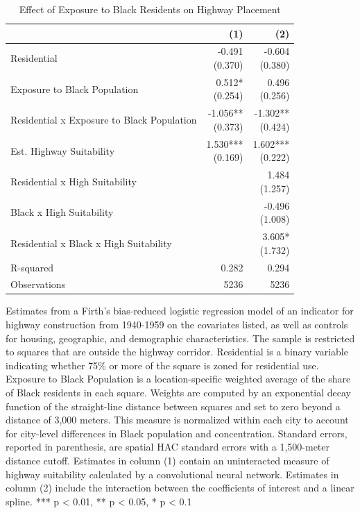 \begin{table}[h]
\centering
\caption{Effect of Exposure to Black Residents on Highway Placement}
\label{tab:results/black_share}
\begin{threeparttable}
\begin{tabular*}{0.8\textwidth}{@{\extracolsep{\fill}}l*{2}{r}}
\toprule
 & (1) & (2) \\
\midrule
Residential & \makecell[tr]{-0.491 \\ (0.370)} & \makecell[tr]{-0.604 \\ (0.380)} \\
Exposure to Black Population & \makecell[tr]{0.512{*} \\ (0.254)} & \makecell[tr]{0.496 \\ (0.256)} \\
Residential x Exposure to Black Population & \makecell[tr]{-1.056{**} \\ (0.373)} & \makecell[tr]{-1.302{**} \\ (0.424)} \\
Est. Highway Suitability & \makecell[tr]{1.530{***} \\ (0.169)} & \makecell[tr]{1.602{***} \\ (0.222)} \\
Residential x High Suitability &  & \makecell[tr]{1.484 \\ (1.257)} \\
Black x High Suitability &  & \makecell[tr]{-0.496 \\ (1.008)} \\
Residential x Black x High Suitability &  & \makecell[tr]{3.605{*} \\ (1.732)} \\
R-squared & 0.282 & 0.294 \\
Observations & 5236 & 5236 \\
\bottomrule
\end{tabular*}
\begin{tablenotes}[flushleft]
\footnotesize
\item Estimates from a Firth's bias-reduced logistic regression model of an indicator for highway construction from 1940-1959 on the covariates listed, as well as controls for housing, geographic, and demographic characteristics. The sample is restricted to squares that are outside the highway corridor. Residential is a binary variable indicating whether 75\% or more of the square is zoned for residential use. Exposure to Black Population is a location-specific weighted average of the share of Black residents in each square. Weights are computed by an exponential decay function of the straight-line distance between squares and set to zero beyond a distance of 3,000 meters. This measure is normalized within each city to account for city-level differences in Black population and concentration. Standard errors, reported in parenthesis, are \textcite{conley_gmm_1999} spatial HAC standard errors with a 1,500-meter distance cutoff. Estimates in column (1) contain an uninteracted measure of highway suitability calculated by a convolutional neural network. Estimates in column (2) include the interaction between the coefficients of interest and a linear spline. *** p < 0.01, ** p < 0.05, * p < 0.1

\end{tablenotes}
\end{threeparttable}
\end{table}
